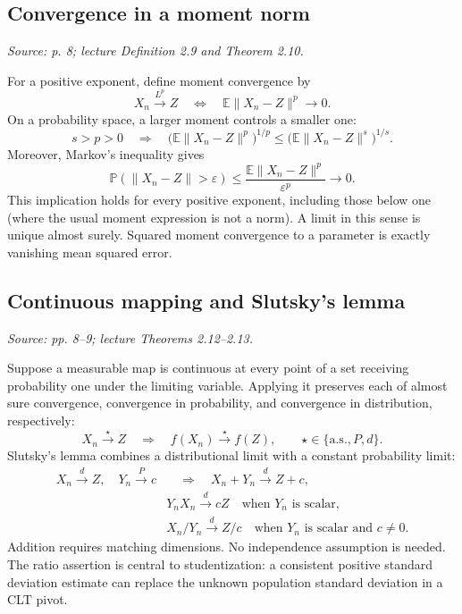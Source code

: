 \documentclass[12pt]{article}
\newcommand{\E}{\mathbb E}
\newcommand{\Prob}{\mathbb P}
\begin{document}
\subsection{Convergence in a moment norm}
\textit{Source: p. 8; lecture Definition 2.9 and Theorem 2.10.}

For a positive exponent, define moment convergence by
\begin{equation}
 X_n\xrightarrow{L^p}Z
 \quad\Longleftrightarrow\quad \E\|X_n-Z\|^p\to0.
\end{equation}
On a probability space, a larger moment controls a smaller one:
\begin{equation}
 s>p>0\quad\Longrightarrow\quad
 \bigl(\E\|X_n-Z\|^p\bigr)^{1/p}
 \le\bigl(\E\|X_n-Z\|^s\bigr)^{1/s}.
\end{equation}
Moreover, Markov's inequality gives
\begin{equation}
 \Prob(\|X_n-Z\|>\varepsilon)
 \le\frac{\E\|X_n-Z\|^p}{\varepsilon^p}\to0.
\end{equation}
This implication holds for every positive exponent, including those below
one (where the usual moment expression is not a norm). A limit in this
sense is unique almost surely. Squared moment convergence to a parameter
is exactly vanishing mean squared error.

\subsection{Continuous mapping and Slutsky's lemma}
\textit{Source: pp. 8--9; lecture Theorems 2.12--2.13.}

Suppose a measurable map is continuous at every point of a set receiving
probability one under the limiting variable. Applying it preserves each of
almost sure convergence, convergence in probability, and convergence in
distribution, respectively:
\begin{equation}
 X_n\xrightarrow{\star}Z\quad\Longrightarrow\quad
 f(X_n)\xrightarrow{\star}f(Z),
 \qquad \star\in\{\mathrm{a.s.},P,d\}.
\end{equation}
Slutsky's lemma combines a distributional limit with a constant probability
limit:
\begin{align}
 X_n\xrightarrow{d}Z,\quad Y_n\xrightarrow{P}c
 &\quad\Longrightarrow\quad X_n+Y_n\xrightarrow{d}Z+c,\\
 &Y_nX_n\xrightarrow{d}cZ\quad\text{when }Y_n\text{ is scalar},\\
 &X_n/Y_n\xrightarrow{d}Z/c\quad\text{when }Y_n\text{ is scalar and }c\ne0.
\end{align}
Addition requires matching dimensions. No independence assumption is needed.
The ratio assertion is central to studentization: a consistent positive
standard deviation estimate can replace the unknown population standard
deviation in a CLT pivot.
\end{document}
